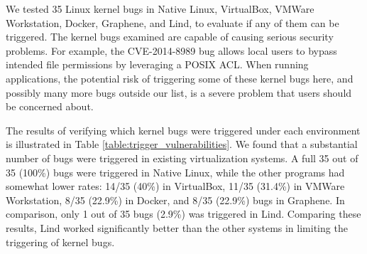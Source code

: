 We tested 35 Linux kernel bugs in Native Linux, VirtualBox, VMWare
Workstation, Docker, Graphene, 
and Lind, to evaluate if any of them can be triggered. The kernel bugs
examined 
are capable of causing serious security problems. For example, 
the CVE-2014-8989 bug allows local users to bypass intended file
permissions by leveraging a POSIX ACL. 
When running applications, the potential risk of triggering some of these
kernel bugs here, 
and possibly many more bugs outside our list, is a severe problem that
users should be concerned about.

The results of verifying which kernel bugs were triggered under each
environment is illustrated in Table \ref{table:trigger_vulnerabilities}. 
We found that a substantial number of bugs were triggered in existing
virtualization systems. 
A full 35 out of 35 (100\%) bugs were triggered in Native Linux, 
while the other programs had somewhat lower rates: 14/35 (40\%) in
VirtualBox, 
11/35 (31.4\%)  in VMWare Workstation, 8/35 (22.9\%)  in Docker, and 8/35
(22.9\%) bugs in Graphene. 
In comparison, only 1 out of 35 bugs  (2.9\%)  was triggered in Lind. 
Comparing these results, Lind worked significantly better than the other
systems in limiting the triggering of kernel bugs.

